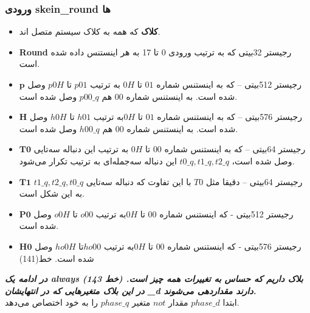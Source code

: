 \subsubsection{
	ورودی skein\_round ها
}
\begin{itemize}
	\item
	      \textbf{کلاک}
	      که همه به کلاک سیستم متصل اند.
	\item
	      \textbf{Round}
	      رجیستر 32بیتی که به ترتیب ورودی 0 تا 17 به هر اینستنس داده شده است.
	\item
	      \textbf{$\textbf{p}$} 
	      رجیستر 512بیتی – که به اینستنس شماره $01$ تا $0H$ به ترتیب $p01$ تا $p0H$ وصل شده است. به اینستنس شماره $00$ هم $p00\_q$ وصل شده است.
	\item
	      \textbf{$\textbf{H}$}
	      رجیستر 576بیتی – که به اینستنس شماره $01$ تا $0H $به ترتیب $h01$ تا $h0H$ وصل شده است. به اینستنس شماره $00$ هم $h00\_q$ وصل شده است.
	\item
	      \textbf{$\textbf{T0}$}
	      رجیستر 64بیتی –   که به اینستنس شماره $00$ تا $0H$ به ترتیب این دنباله سه‌تایی وصل شده است،
	      $t0\_q, t1\_q, t2\_q$
	      این دنباله سه‌جمله‌ای به ترتیب تکرار می‌شود.
	\item
	      \textbf{$\textbf{T1}$}
	      رجیستر 64بیتی – دقیقا مثل $T0$ با این تفاوت که دنباله سه‌تایی $ t1\_q, t2\_q, t0\_q $ به این شکل است.
	\item
	      \textbf{$\textbf{P0}$}
	      رجیستر 512بیتی - که اینستنس شماره $00$ تا $0H$به ترتیب $o00$ تا $o0H$ وصل شده است. 
	\item
	      \textbf{$\textbf{H0}$}
	      رجیستر 576بیتی - که اینستنس شماره $00$ تا $0H $به ترتیب $ho00 $تا $ho0H$ وصل شده است. خط(141)
	      
\end{itemize}
\textit{\textbf{
	در ادامه یک always بلاک داریم که حساس به تغییرات همه چیز است. (خط 143)
	در این بلاک متغیرهایی که در انتهایشان
	\_d
دارند مقداردهی می‌شوند.}}\\
\newline
ابتدا $phase\_d$ مقدار $not$ متغیر $phase\_q$ را به خود اختصاص می‌دهد.
